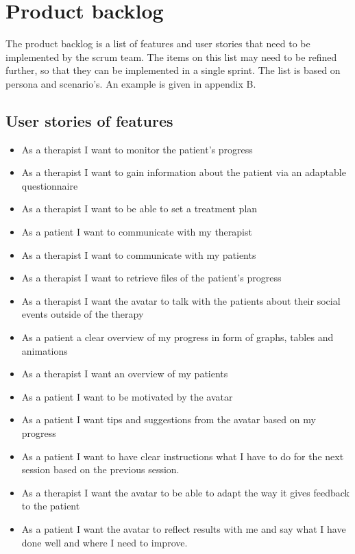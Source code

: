 \chapter{Product backlog}
The product backlog is a list of features and user stories that need to be implemented by the \gls{scrum} team. The items on this list may need to be refined further, so that they can be implemented in a single \gls{sprint}. The list is based on persona and scenario's. An example is given in appendix B.

\section{User stories of features}
\begin{itemize}
\item As a therapist I want to monitor the patient's progress 
\item As a therapist I want to gain information about the patient via an adaptable questionnaire
\item As a therapist I want to be able to set a treatment plan
\item As a patient I want to communicate with my therapist
\item As a therapist I want to communicate with my patients
\item As a therapist I want to retrieve files of the patient's progress
\item As a therapist I want the \gls{avatar} to talk with the patients about their social events outside of the therapy
\item As a patient a clear overview of my progress in form of graphs, tables and animations
\item As a therapist I want an overview of my patients 
\item As a patient I want to be motivated by the \gls{avatar}
\item As a patient I want tips and suggestions from the \gls{avatar} based on my progress
\item As a patient I want to have clear instructions what I have to do for the next session based on the previous session.
\item As a therapist I want the \gls{avatar} to be able to adapt the way it gives feedback to the patient
\item As a patient I want the \gls{avatar} to reflect results with me and say what I have done well and where I need to improve.
\end{itemize}
 
